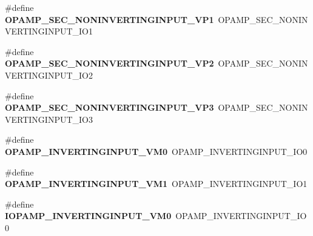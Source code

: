 \begin{DoxyCompactItemize}
\item 
\#define {\bfseries O\+P\+A\+M\+P\+\_\+\+S\+E\+C\+\_\+\+N\+O\+N\+I\+N\+V\+E\+R\+T\+I\+N\+G\+I\+N\+P\+U\+T\+\_\+\+V\+P1}~O\+P\+A\+M\+P\+\_\+\+S\+E\+C\+\_\+\+N\+O\+N\+I\+N\+V\+E\+R\+T\+I\+N\+G\+I\+N\+P\+U\+T\+\_\+\+I\+O1\hypertarget{group___h_a_l___o_p_a_m_p___aliased___defines_ga044a5996a702fe67bd404674d6ce2890}{}\label{group___h_a_l___o_p_a_m_p___aliased___defines_ga044a5996a702fe67bd404674d6ce2890}

\item 
\#define {\bfseries O\+P\+A\+M\+P\+\_\+\+S\+E\+C\+\_\+\+N\+O\+N\+I\+N\+V\+E\+R\+T\+I\+N\+G\+I\+N\+P\+U\+T\+\_\+\+V\+P2}~O\+P\+A\+M\+P\+\_\+\+S\+E\+C\+\_\+\+N\+O\+N\+I\+N\+V\+E\+R\+T\+I\+N\+G\+I\+N\+P\+U\+T\+\_\+\+I\+O2\hypertarget{group___h_a_l___o_p_a_m_p___aliased___defines_ga99d279a0ad7e685d456f454d4eb90c02}{}\label{group___h_a_l___o_p_a_m_p___aliased___defines_ga99d279a0ad7e685d456f454d4eb90c02}

\item 
\#define {\bfseries O\+P\+A\+M\+P\+\_\+\+S\+E\+C\+\_\+\+N\+O\+N\+I\+N\+V\+E\+R\+T\+I\+N\+G\+I\+N\+P\+U\+T\+\_\+\+V\+P3}~O\+P\+A\+M\+P\+\_\+\+S\+E\+C\+\_\+\+N\+O\+N\+I\+N\+V\+E\+R\+T\+I\+N\+G\+I\+N\+P\+U\+T\+\_\+\+I\+O3\hypertarget{group___h_a_l___o_p_a_m_p___aliased___defines_gac8152b9a1e42f8513a907918f2db651b}{}\label{group___h_a_l___o_p_a_m_p___aliased___defines_gac8152b9a1e42f8513a907918f2db651b}

\item 
\#define {\bfseries O\+P\+A\+M\+P\+\_\+\+I\+N\+V\+E\+R\+T\+I\+N\+G\+I\+N\+P\+U\+T\+\_\+\+V\+M0}~O\+P\+A\+M\+P\+\_\+\+I\+N\+V\+E\+R\+T\+I\+N\+G\+I\+N\+P\+U\+T\+\_\+\+I\+O0\hypertarget{group___h_a_l___o_p_a_m_p___aliased___defines_gaa6ab36e92c4c9e5f08a766d722cc12e2}{}\label{group___h_a_l___o_p_a_m_p___aliased___defines_gaa6ab36e92c4c9e5f08a766d722cc12e2}

\item 
\#define {\bfseries O\+P\+A\+M\+P\+\_\+\+I\+N\+V\+E\+R\+T\+I\+N\+G\+I\+N\+P\+U\+T\+\_\+\+V\+M1}~O\+P\+A\+M\+P\+\_\+\+I\+N\+V\+E\+R\+T\+I\+N\+G\+I\+N\+P\+U\+T\+\_\+\+I\+O1\hypertarget{group___h_a_l___o_p_a_m_p___aliased___defines_ga1d73eb5e8d6e1c4e22cbdd896586375a}{}\label{group___h_a_l___o_p_a_m_p___aliased___defines_ga1d73eb5e8d6e1c4e22cbdd896586375a}

\item 
\#define {\bfseries I\+O\+P\+A\+M\+P\+\_\+\+I\+N\+V\+E\+R\+T\+I\+N\+G\+I\+N\+P\+U\+T\+\_\+\+V\+M0}~O\+P\+A\+M\+P\+\_\+\+I\+N\+V\+E\+R\+T\+I\+N\+G\+I\+N\+P\+U\+T\+\_\+\+I\+O0\hypertarget{group___h_a_l___o_p_a_m_p___aliased___defines_ga16004eef1f4113ba471e24cd51570a78}{}\label{group___h_a_l___o_p_a_m_p___aliased___defines_ga16004eef1f4113ba471e24cd51570a78}


\end{DoxyCompactItemize}

